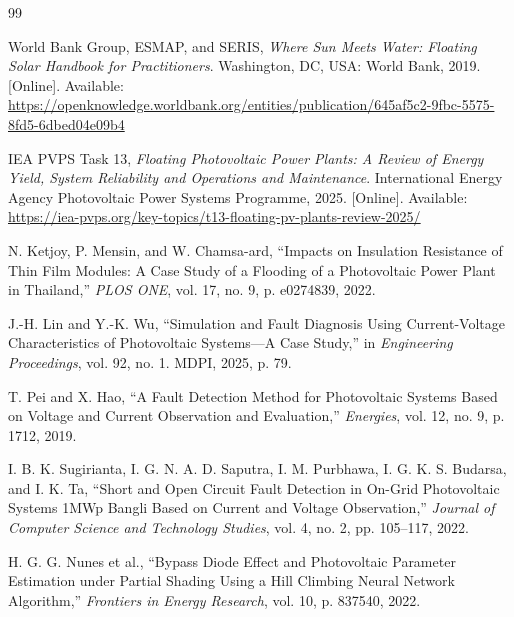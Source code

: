 
\clearpage
{}
{}
\renewcommand\bibname{DAFTAR PUSTAKA}

\begin{thebibliography}{99}

World Bank Group, ESMAP, and SERIS, \textit{Where Sun Meets Water: Floating Solar Handbook for Practitioners}. Washington, DC, USA: World Bank, 2019. [Online]. Available: \url{https://openknowledge.worldbank.org/entities/publication/645af5c2-9fbc-5575-8fd5-6dbed04e09b4}

IEA PVPS Task 13, \textit{Floating Photovoltaic Power Plants: A Review of Energy Yield, System Reliability and Operations and Maintenance}. International Energy Agency Photovoltaic Power Systems Programme, 2025. [Online]. Available: \url{https://iea-pvps.org/key-topics/t13-floating-pv-plants-review-2025/}

N. Ketjoy, P. Mensin, and W. Chamsa-ard, ``Impacts on Insulation Resistance of Thin Film Modules: A Case Study of a Flooding of a Photovoltaic Power Plant in Thailand,'' \textit{PLOS ONE}, vol. 17, no. 9, p. e0274839, 2022.

J.-H. Lin and Y.-K. Wu, ``Simulation and Fault Diagnosis Using Current-Voltage Characteristics of Photovoltaic Systems---A Case Study,'' in \textit{Engineering Proceedings}, vol. 92, no. 1. MDPI, 2025, p. 79.

T. Pei and X. Hao, ``A Fault Detection Method for Photovoltaic Systems Based on Voltage and Current Observation and Evaluation,'' \textit{Energies}, vol. 12, no. 9, p. 1712, 2019.

I. B. K. Sugirianta, I. G. N. A. D. Saputra, I. M. Purbhawa, I. G. K. S. Budarsa, and I. K. Ta, ``Short and Open Circuit Fault Detection in On-Grid Photovoltaic Systems 1MWp Bangli Based on Current and Voltage Observation,'' \textit{Journal of Computer Science and Technology Studies}, vol. 4, no. 2, pp. 105--117, 2022.

H. G. G. Nunes et al., ``Bypass Diode Effect and Photovoltaic Parameter Estimation under Partial Shading Using a Hill Climbing Neural Network Algorithm,'' \textit{Frontiers in Energy Research}, vol. 10, p. 837540, 2022.


\end{thebibliography}
